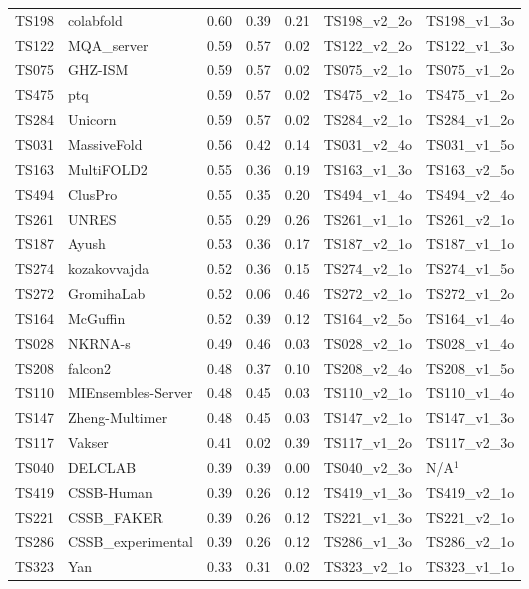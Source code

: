 \begin{table}[ht]
{\begin{tabular}{llrrrll}
TS198 & colabfold & 0.60 & 0.39 & 0.21 & TS198\_v2\_2o & TS198\_v1\_3o \\ 
TS122 & MQA\_server & 0.59 & 0.57 & 0.02 & TS122\_v2\_2o & TS122\_v1\_3o \\ 
TS075 & GHZ-ISM & 0.59 & 0.57 & 0.02 & TS075\_v2\_1o & TS075\_v1\_2o \\ 
TS475 & ptq & 0.59 & 0.57 & 0.02 & TS475\_v2\_1o & TS475\_v1\_2o \\ 
TS284 & Unicorn & 0.59 & 0.57 & 0.02 & TS284\_v2\_1o & TS284\_v1\_2o \\ 
TS031 & MassiveFold & 0.56 & 0.42 & 0.14 & TS031\_v2\_4o & TS031\_v1\_5o \\ 
TS163 & MultiFOLD2 & 0.55 & 0.36 & 0.19 & TS163\_v1\_3o & TS163\_v2\_5o \\ 
TS494 & ClusPro & 0.55 & 0.35 & 0.20 & TS494\_v1\_4o & TS494\_v2\_4o \\ 
TS261 & UNRES & 0.55 & 0.29 & 0.26 & TS261\_v1\_1o & TS261\_v2\_1o \\ 
TS187 & Ayush & 0.53 & 0.36 & 0.17 & TS187\_v2\_1o & TS187\_v1\_1o \\ 
TS274 & kozakovvajda & 0.52 & 0.36 & 0.15 & TS274\_v2\_1o & TS274\_v1\_5o \\ 
TS272 & GromihaLab & 0.52 & 0.06 & 0.46 & TS272\_v2\_1o & TS272\_v1\_2o \\ 
TS164 & McGuffin & 0.52 & 0.39 & 0.12 & TS164\_v2\_5o & TS164\_v1\_4o \\ 
TS028 & NKRNA-s & 0.49 & 0.46 & 0.03 & TS028\_v2\_1o & TS028\_v1\_4o \\ 
TS208 & falcon2 & 0.48 & 0.37 & 0.10 & TS208\_v2\_4o & TS208\_v1\_5o \\ 
TS110 & MIEnsembles-Server & 0.48 & 0.45 & 0.03 & TS110\_v2\_1o & TS110\_v1\_4o \\ 
TS147 & Zheng-Multimer & 0.48 & 0.45 & 0.03 & TS147\_v2\_1o & TS147\_v1\_3o \\ 
TS117 & Vakser & 0.41 & 0.02 & 0.39 & TS117\_v1\_2o & TS117\_v2\_3o \\ 
TS040 & DELCLAB & 0.39 & 0.39 & 0.00 & TS040\_v2\_3o & N/A$^{1}$ \\ 
TS419 & CSSB-Human & 0.39 & 0.26 & 0.12 & TS419\_v1\_3o & TS419\_v2\_1o \\ 
TS221 & CSSB\_FAKER & 0.39 & 0.26 & 0.12 & TS221\_v1\_3o & TS221\_v2\_1o \\ 
TS286 & CSSB\_experimental & 0.39 & 0.26 & 0.12 & TS286\_v1\_3o & TS286\_v2\_1o \\ 
TS323 & Yan & 0.33 & 0.31 & 0.02 & TS323\_v2\_1o & TS323\_v1\_1o \\ 

\end{tabular}}
\end{table}
